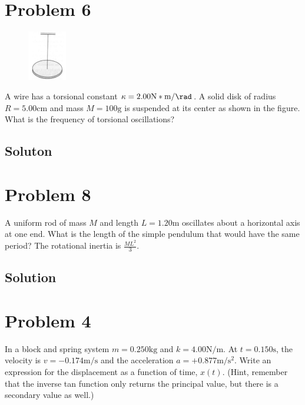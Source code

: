 \documentclass[12pt]{article}
\begin{document}
\pagebreak
\section{Problem 6}
\begin{figure}
    \vspace{-30pt}
    \includegraphics[width=0.15\textwidth]{graph_6.png} 
\end{figure}
A wire has a torsional constant $\kappa = 2.00 \unit{\newton*\meter/\rad}$. A solid disk of radius $R = 5.00 \unit{\centi\meter}$ and mass $M = 100 \unit{\gram}$ is suspended at its center as shown in the figure. What is the frequency of torsional oscillations?

\subsection{Soluton}



\pagebreak
\section{Problem 8}
A uniform rod of mass $M$ and length $L = 1.20 \unit{\meter}$ oscillates about a horizontal axis at one end. What is the length of the simple pendulum that would have the same period? The rotational inertia is $\frac{ML^2}{3}$.

\subsection{Solution}

\pagebreak
\section{Problem 4}
In a block and spring system $m = 0.250 \unit{\kilo\gram}$ and $k = 4.00 \unit{\newton/\meter}$. At $t = 0.150 \unit{\second}$, the velocity is $v = -0.174 \unit{\meter/\second}$ and the acceleration $a = +0.877 \unit{\meter/\second^2}$. Write an expression for the displacement as a function of time, $x(t)$. (Hint, remember that the inverse tan function only returns the principal value, but there is a secondary value as well.)
\end{document}
